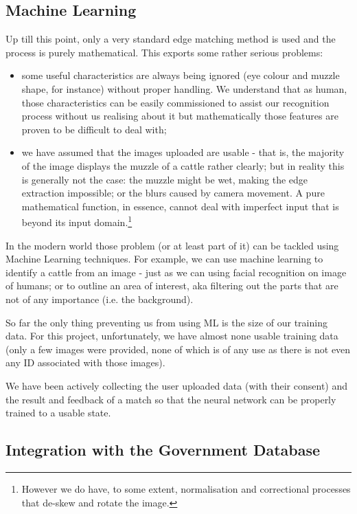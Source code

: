 \subsection{Machine Learning}

Up till this point, only a very standard edge matching method is used and the process is purely mathematical. This exports some rather serious problems:

\begin{itemize}
	\item some useful characteristics are always being ignored (eye colour and muzzle shape, for instance) without proper handling. We understand that as human, those characteristics can be easily commissioned to assist our recognition process without us realising about it but mathematically those features are proven to be difficult to deal with;
	\item we have assumed that the images uploaded are usable - that is, the majority of the image displays the muzzle of a cattle rather clearly; but in reality this is generally not the case: the muzzle might be wet, making the edge extraction impossible; or the blurs caused by camera movement. A pure mathematical function, in essence, cannot deal with imperfect input that is beyond its input domain.\footnote{However we do have, to some extent, normalisation and correctional processes that de-skew and rotate the image.}
\end{itemize}

In the modern world those problem (or at least part of it) can be tackled using Machine Learning techniques. For example, we can use machine learning to identify a cattle from an image - just as we can using facial recognition on image of humans; or to outline an area of interest, aka filtering out the parts that are not of any importance (i.e. the background).

So far the only thing preventing us from using ML is the size of our training data. For this project, unfortunately, we have almost none usable training data (only a few images were provided, none of which is of any use as there is not even any ID associated with those images).

We have been actively collecting the user uploaded data (with their consent) and the result and feedback of a match so that the neural network can be properly trained to a usable state.

\subsection{Integration with the Government Database}


